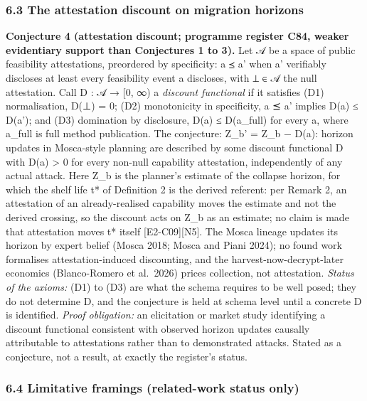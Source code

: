 \documentclass[
  11pt,
]{article}
\begin{document}
\subsubsection{6.3 The attestation discount on migration
horizons}\label{the-attestation-discount-on-migration-horizons}

\textbf{Conjecture 4 (attestation discount; programme register C84,
weaker evidentiary support than Conjectures 1 to 3).} Let 𝒜 be a space
of public feasibility attestations, preordered by specificity: a ⪯ a'
when a' verifiably discloses at least every feasibility event a
discloses, with ⊥ ∈ 𝒜 the null attestation. Call D : 𝒜 → {[}0, ∞) a
\emph{discount functional} if it satisfies (D1) normalisation, D(⊥) = 0;
(D2) monotonicity in specificity, a ⪯ a' implies D(a) ≤ D(a'); and (D3)
domination by disclosure, D(a) ≤ D(a\_full) for every a, where a\_full
is full method publication. The conjecture: Z\_b' = Z\_b − D(a): horizon
updates in Mosca-style planning are described by some discount
functional D with D(a) \textgreater{} 0 for every non-null capability
attestation, independently of any actual attack. Here Z\_b is the
planner's estimate of the collapse horizon, for which the shelf life t*
of Definition 2 is the derived referent: per Remark 2, an attestation of
an already-realised capability moves the estimate and not the derived
crossing, so the discount acts on Z\_b as an estimate; no claim is made
that attestation moves t* itself {[}E2-C09{]}{[}N5{]}. The Mosca lineage
updates its horizon by expert belief (Mosca 2018; Mosca and Piani 2024);
no found work formalises attestation-induced discounting, and the
harvest-now-decrypt-later economics (Blanco-Romero et al.~2026) prices
collection, not attestation. \emph{Status of the axioms:} (D1) to (D3)
are what the schema requires to be well posed; they do not determine D,
and the conjecture is held at schema level until a concrete D is
identified. \emph{Proof obligation:} an elicitation or market study
identifying a discount functional consistent with observed horizon
updates causally attributable to attestations rather than to
demonstrated attacks. Stated as a conjecture, not a result, at exactly
the register's status.

\subsubsection{6.4 Limitative framings (related-work status
only)}\label{limitative-framings-related-work-status-only}
\end{document}
